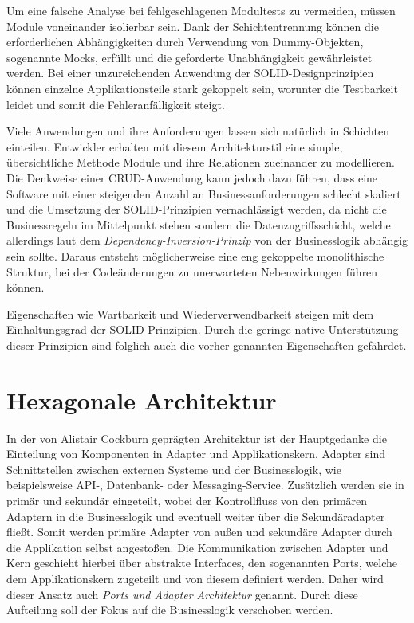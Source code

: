 \documentclass[conference]{IEEEtran}
\begin{document}
Um eine falsche Analyse bei fehlgeschlagenen Modultests zu vermeiden, müssen Module voneinander isolierbar sein. Dank der Schichtentrennung können die erforderlichen Abhängigkeiten durch Verwendung von Dummy-Objekten, sogenannte Mocks, erfüllt und die geforderte Unabhängigkeit gewährleistet werden. Bei einer unzureichenden Anwendung der SOLID-Designprinzipien können einzelne Applikationsteile stark gekoppelt sein, worunter die Testbarkeit leidet und somit die Fehleranfälligkeit steigt.

Viele Anwendungen und ihre Anforderungen lassen sich natürlich in Schichten einteilen. Entwickler erhalten mit diesem Architekturstil eine simple, übersichtliche Methode Module und ihre Relationen zueinander zu modellieren. Die Denkweise einer CRUD-Anwendung kann jedoch dazu führen, dass eine Software mit einer steigenden Anzahl an Businessanforderungen schlecht skaliert und die Umsetzung der SOLID-Prinzipien vernachlässigt werden, da nicht die Businessregeln im Mittelpunkt stehen sondern die Datenzugriffsschicht, welche allerdings laut dem \emph{Dependency-Inversion-Prinzip} von der Businesslogik abhängig sein sollte. Daraus entsteht möglicherweise eine eng gekoppelte monolithische Struktur, bei der Codeänderungen zu unerwarteten Nebenwirkungen führen können. \cite{layer.solid}

Eigenschaften wie Wartbarkeit und Wiederverwendbarkeit steigen mit dem Einhaltungsgrad der SOLID-Prinzipien. Durch die geringe native Unterstützung dieser Prinzipien sind folglich auch die vorher genannten Eigenschaften gefährdet. 






\section{Hexagonale Architektur} 


In der von Alistair Cockburn geprägten Architektur ist der Hauptgedanke die Einteilung von Komponenten in Adapter und Applikationskern. Adapter sind Schnittstellen zwischen externen Systeme und der Businesslogik, wie beispielsweise API-, Datenbank- oder Messaging-Service. Zusätzlich werden sie in primär und sekundär eingeteilt, wobei der Kontrollfluss von den primären Adaptern in die Businesslogik und eventuell weiter über die Sekundäradapter fließt. Somit werden primäre Adapter von außen und sekundäre Adapter durch die Applikation selbst angestoßen. Die Kommunikation zwischen Adapter und Kern geschieht hierbei über abstrakte Interfaces, den sogenannten Ports, welche dem Applikationskern zugeteilt und von diesem definiert werden. Daher wird dieser Ansatz auch \emph{Ports und Adapter Architektur} genannt. Durch diese Aufteilung soll der Fokus auf die Businesslogik verschoben werden. \cite{hex} \cite{Martin.2018} 
\end{document}
